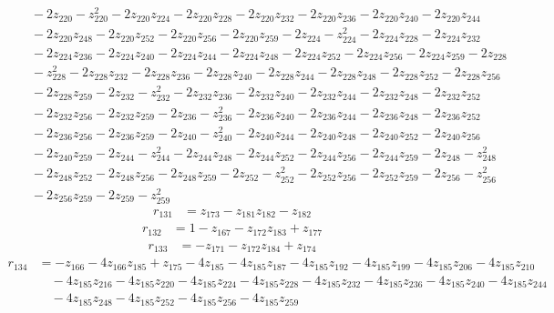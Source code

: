 \begin{align*}
&\quad  - 2z_{220} - z_{220}^{2} - 2z_{220}z_{224} - 2z_{220}z_{228} - 2z_{220}z_{232} - 2z_{220}z_{236} - 2z_{220}z_{240} - 2z_{220}z_{244} \\
&\quad  - 2z_{220}z_{248} - 2z_{220}z_{252} - 2z_{220}z_{256} - 2z_{220}z_{259} - 2z_{224} - z_{224}^{2} - 2z_{224}z_{228} - 2z_{224}z_{232} \\
&\quad  - 2z_{224}z_{236} - 2z_{224}z_{240} - 2z_{224}z_{244} - 2z_{224}z_{248} - 2z_{224}z_{252} - 2z_{224}z_{256} - 2z_{224}z_{259} - 2z_{228} \\
&\quad  - z_{228}^{2} - 2z_{228}z_{232} - 2z_{228}z_{236} - 2z_{228}z_{240} - 2z_{228}z_{244} - 2z_{228}z_{248} - 2z_{228}z_{252} - 2z_{228}z_{256} \\
&\quad  - 2z_{228}z_{259} - 2z_{232} - z_{232}^{2} - 2z_{232}z_{236} - 2z_{232}z_{240} - 2z_{232}z_{244} - 2z_{232}z_{248} - 2z_{232}z_{252} \\
&\quad  - 2z_{232}z_{256} - 2z_{232}z_{259} - 2z_{236} - z_{236}^{2} - 2z_{236}z_{240} - 2z_{236}z_{244} - 2z_{236}z_{248} - 2z_{236}z_{252} \\
&\quad  - 2z_{236}z_{256} - 2z_{236}z_{259} - 2z_{240} - z_{240}^{2} - 2z_{240}z_{244} - 2z_{240}z_{248} - 2z_{240}z_{252} - 2z_{240}z_{256} \\
&\quad  - 2z_{240}z_{259} - 2z_{244} - z_{244}^{2} - 2z_{244}z_{248} - 2z_{244}z_{252} - 2z_{244}z_{256} - 2z_{244}z_{259} - 2z_{248} - z_{248}^{2} \\
&\quad  - 2z_{248}z_{252} - 2z_{248}z_{256} - 2z_{248}z_{259} - 2z_{252} - z_{252}^{2} - 2z_{252}z_{256} - 2z_{252}z_{259} - 2z_{256} - z_{256}^{2} \\
&\quad  - 2z_{256}z_{259} - 2z_{259} - z_{259}^{2}
\end{align*}
\begin{align*}
r_{131} &= z_{173} - z_{181}z_{182} - z_{182}
\end{align*}
\begin{align*}
r_{132} &= 1 - z_{167} - z_{172}z_{183} + z_{177}
\end{align*}
\begin{align*}
r_{133} &= -z_{171} - z_{172}z_{184} + z_{174}
\end{align*}
\begin{align*}
r_{134} &= -z_{166} - 4z_{166}z_{185} + z_{175} - 4z_{185} - 4z_{185}z_{187} - 4z_{185}z_{192} - 4z_{185}z_{199} - 4z_{185}z_{206} - 4z_{185}z_{210} \\
&\quad  - 4z_{185}z_{216} - 4z_{185}z_{220} - 4z_{185}z_{224} - 4z_{185}z_{228} - 4z_{185}z_{232} - 4z_{185}z_{236} - 4z_{185}z_{240} - 4z_{185}z_{244} \\
&\quad  - 4z_{185}z_{248} - 4z_{185}z_{252} - 4z_{185}z_{256} - 4z_{185}z_{259}
\end{align*}
